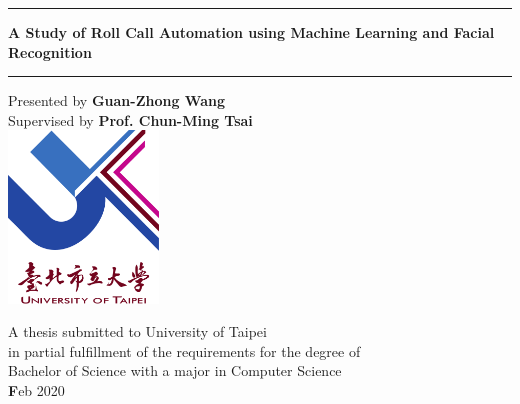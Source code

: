\def\title{A Study of Roll Call Automation using Machine Learning and Facial Recognition}
\def\author{Guan-Zhong Wang}
\def\supervisor{Prof. Chun-Ming Tsai}
\def\date{Feb 2020}

\begin{titlepage}
  \begin{center}
    \noindent\rule{16cm}{1.5pt}
    \vspace{-0.8cm}

    \textbf{\huge \title}
    \noindent\rule{16cm}{1.5pt}
    \vspace{0.5cm}

    {\large Presented by} \textbf{\Large \author}\\
    \vspace{0.3cm}
    {\large Supervised by} \textbf{\Large \supervisor}\\

    \vspace{2.0cm}
    \includegraphics[width=0.3\textwidth]{figures/utaipei.png}
    \vspace{1.5cm}

    \vfill

    {\Large A thesis submitted to University of Taipei\\
      in partial fulfillment of the requirements for the degree of\\
      Bachelor of Science with a major in Computer Science\\
    }
    \vspace{1.2cm}
    {\Large \textbf\date}

    \vspace{3.5cm}

  \end{center}
\end{titlepage}
